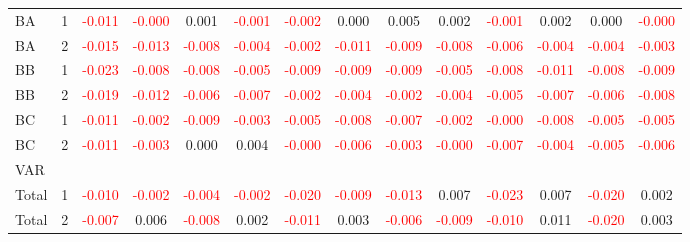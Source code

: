 \begin{table}[!htb]
{\begin{tabular}{llcccccccccccc}
BA & 1 & \textcolor{red}{-0.011} & \textcolor{red}{-0.000} & 0.001 & \textcolor{red}{-0.001} & \textcolor{red}{-0.002} & 0.000 & 0.005 & 0.002 & \textcolor{red}{-0.001} & 0.002 & 0.000 & \textcolor{red}{-0.000}\\
BA & 2 & \textcolor{red}{-0.015} & \textcolor{red}{-0.013} & \textcolor{red}{-0.008} & \textcolor{red}{-0.004} & \textcolor{red}{-0.002} & \textcolor{red}{-0.011} & \textcolor{red}{-0.009} & \textcolor{red}{-0.008} & \textcolor{red}{-0.006} & \textcolor{red}{-0.004} & \textcolor{red}{-0.004} & \textcolor{red}{-0.003}\\
BB & 1 & \textcolor{red}{-0.023} & \textcolor{red}{-0.008} & \textcolor{red}{-0.008} & \textcolor{red}{-0.005} & \textcolor{red}{-0.009} & \textcolor{red}{-0.009} & \textcolor{red}{-0.009} & \textcolor{red}{-0.005} & \textcolor{red}{-0.008} & \textcolor{red}{-0.011} & \textcolor{red}{-0.008} & \textcolor{red}{-0.009}\\
BB & 2 & \textcolor{red}{-0.019} & \textcolor{red}{-0.012} & \textcolor{red}{-0.006} & \textcolor{red}{-0.007} & \textcolor{red}{-0.002} & \textcolor{red}{-0.004} & \textcolor{red}{-0.002} & \textcolor{red}{-0.004} & \textcolor{red}{-0.005} & \textcolor{red}{-0.007} & \textcolor{red}{-0.006} & \textcolor{red}{-0.008}\\
BC & 1 & \textcolor{red}{-0.011} & \textcolor{red}{-0.002} & \textcolor{red}{-0.009} & \textcolor{red}{-0.003} & \textcolor{red}{-0.005} & \textcolor{red}{-0.008} & \textcolor{red}{-0.007} & \textcolor{red}{-0.002} & \textcolor{red}{-0.000} & \textcolor{red}{-0.008} & \textcolor{red}{-0.005} & \textcolor{red}{-0.005}\\
BC & 2 & \textcolor{red}{-0.011} & \textcolor{red}{-0.003} & 0.000 & 0.004 & \textcolor{red}{-0.000} & \textcolor{red}{-0.006} & \textcolor{red}{-0.003} & \textcolor{red}{-0.000} & \textcolor{red}{-0.007} & \textcolor{red}{-0.004} & \textcolor{red}{-0.005} & \textcolor{red}{-0.006}\\
\hline
VAR &  &  &  &  &  &  &  &  &  &  &  &  & \\
\hline
Total & 1 & \textcolor{red}{-0.010} & \textcolor{red}{-0.002} & \textcolor{red}{-0.004} & \textcolor{red}{-0.002} & \textcolor{red}{-0.020} & \textcolor{red}{-0.009} & \textcolor{red}{-0.013} & 0.007 & \textcolor{red}{-0.023} & 0.007 & \textcolor{red}{-0.020} & 0.002\\
Total & 2 & \textcolor{red}{-0.007} & 0.006 & \textcolor{red}{-0.008} & 0.002 & \textcolor{red}{-0.011} & 0.003 & \textcolor{red}{-0.006} & \textcolor{red}{-0.009} & \textcolor{red}{-0.010} & 0.011 & \textcolor{red}{-0.020} & 0.003\\

\end{tabular}}
\end{table}
